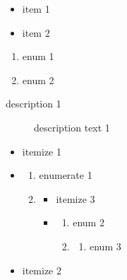 ﻿\begin{itemize}
    \item item 1
    \item item 2
\end{itemize}

\begin{enumerate}
    \item enum 1
    \item enum 2
\end{enumerate}

\begin{description}
    \item[description 1] description text 1
\end{description}

\begin{itemize}
    \item[!] itemize 1
    \item \begin{enumerate}
              \item enumerate 1
              \item \begin{itemize}
                        \item itemize 3
                        \item \begin{enumerate}
                                  \item enum 2
                                  \item \begin{enumerate}
                                            \item enum 3
                                  \end{enumerate}
                        \end{enumerate}
              \end{itemize}
    \end{enumerate}
    \item itemize 2
\end{itemize}

